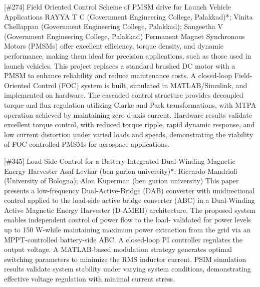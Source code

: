{} \begin{abstract_online} {[\#274] Field Oriented Control Scheme of PMSM drive for Launch Vehicle Applications} {} {RAYYA  T C (Government Engineering College, Palakkad)*; Vinita  Chellappan (Government Engineering College, Palakkad); Sangeetha V (Government Engineering College, Palakkad)} {} Permanent Magnet Synchronous Motors (PMSMs) offer excellent efficiency, torque density, and dynamic performance, making them ideal for precision applications, such as those used in launch vehicles.  This project replaces a standard brushed DC motor with a PMSM to enhance reliability and reduce maintenance costs.  A closed-loop Field-Oriented Control (FOC) system is built, simulated in MATLAB/Simulink, and implemented on hardware.  The cascaded control structure provides decoupled torque and flux regulation utilizing Clarke and Park transformations, with MTPA operation achieved by maintaining zero d-axis current.  Hardware results validate excellent torque control, with reduced torque ripple, rapid dynamic response, and low current distortion under varied loads and speeds, demonstrating the viability of FOC-controlled PMSMs for aerospace applications. \end{abstract_online} 
{} \begin{abstract_online} {[\#345] Load-Side Control for a Battery-Integrated Dual-Winding Magnetic Energy Harvester  } {} {Asaf Levhar (ben gurion university)*; Riccardo Mandrioli (University of Bologna); Alon Kuperman (ben gurion university)} {} This paper presents a low-frequency Dual-Active-Bridge (DAB) converter with unidirectional control applied to the load-side active bridge converter (ABC) in a Dual-Winding Active Magnetic Energy Harvester (D-AMEH) architecture. The proposed system enables independent control of power flow to the load- validated for power levels up to 150 W-while maintaining maximum power extraction from the grid via an MPPT-controlled battery-side ABC. A closed-loop PI controller regulates the output voltage. A MATLAB-based modulation strategy generates optimal switching parameters to minimize the RMS inductor current. PSIM simulation results validate system stability under varying system conditions, demonstrating effective voltage regulation with minimal current stress. \end{abstract_online} 
